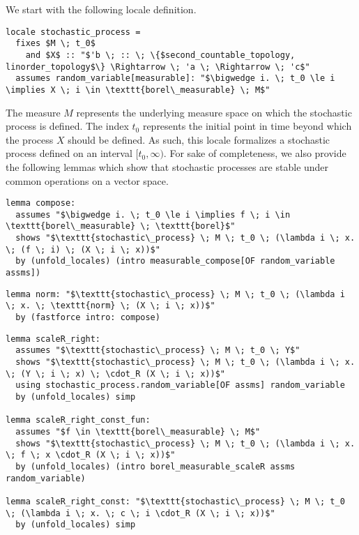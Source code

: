 We start with the following locale definition.

\begin{isadefinition}
{\small
\begin{lstlisting}[style=isabelle]
locale stochastic_process =
  fixes $M \; t_0$ 
  	and $X$ :: "$'b \; :: \; \{$second_countable_topology, linorder_topology$\} \Rightarrow \; 'a \; \Rightarrow \; 'c$"
  assumes random_variable[measurable]: "$\bigwedge i. \; t_0 \le i \implies X \; i \in \texttt{borel\_measurable} \; M$"
\end{lstlisting}
}
\end{isadefinition}

The measure $M$ represents the underlying measure space on which the stochastic process is defined. The index $t_0$ represents the initial point in time beyond which the process $X$ should be defined. As such, this locale formalizes a stochastic process defined on an interval $[t_0, \infty)$. For sake of completeness, we also provide the following lemmas which show that stochastic processes are stable under common operations on a vector space.

\begin{isalemma}
{\small
\begin{lstlisting}[style=isabelle]
lemma compose:
  assumes "$\bigwedge i. \; t_0 \le i \implies f \; i \in \texttt{borel\_measurable} \; \texttt{borel}$"
  shows "$\texttt{stochastic\_process} \; M \; t_0 \; (\lambda i \; x. \; (f \; i) \; (X \; i \; x))$"
  by (unfold_locales) (intro measurable_compose[OF random_variable assms])
  \end{lstlisting}
}
\end{isalemma}


\begin{isalemma}
{\small
\begin{lstlisting}[style=isabelle]
lemma norm: "$\texttt{stochastic\_process} \; M \; t_0 \; (\lambda i \; x. \; \texttt{norm} \; (X \; i \; x))$" 
  by (fastforce intro: compose)
  \end{lstlisting}
}
\end{isalemma}

\begin{isalemma}
{\small
\begin{lstlisting}[style=isabelle]
lemma scaleR_right:
  assumes "$\texttt{stochastic\_process} \; M \; t_0 \; Y$"
  shows "$\texttt{stochastic\_process} \; M \; t_0 \; (\lambda i \; x. \; (Y \; i \; x) \; \cdot_R (X \; i \; x))$"
  using stochastic_process.random_variable[OF assms] random_variable 
  by (unfold_locales) simp

lemma scaleR_right_const_fun: 
  assumes "$f \in \texttt{borel\_measurable} \; M$" 
  shows "$\texttt{stochastic\_process} \; M \; t_0 \; (\lambda i \; x. \; f \; x \cdot_R (X \; i \; x))$" 
  by (unfold_locales) (intro borel_measurable_scaleR assms random_variable)

lemma scaleR_right_const: "$\texttt{stochastic\_process} \; M \; t_0 \; (\lambda i \; x. \; c \; i \cdot_R (X \; i \; x))$"
  by (unfold_locales) simp
\end{lstlisting}
}
\end{isalemma}



